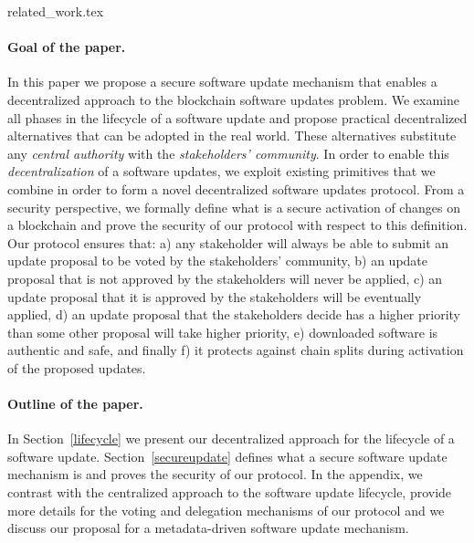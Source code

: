 {related_work.tex}
\paragraph{Goal of the paper.} In this paper we propose a secure software update mechanism that enables a decentralized approach to the blockchain software updates problem. We examine all phases in the lifecycle of a software update and propose practical decentralized alternatives that can be adopted in the real world. These alternatives substitute any \emph{central authority} with the \emph{stakeholders' community}. In order to enable this \emph{decentralization} of a software updates, we exploit existing primitives that we combine in order to form a novel decentralized software updates protocol. From a security perspective, we formally define what is a secure activation of changes on a blockchain and prove the security of our protocol with respect to this definition.  Our protocol ensures that:
a) any stakeholder will always be able to submit an update proposal to be voted by the stakeholders' community, b) an update proposal that is not approved by the stakeholders
 will never be applied, c) an update proposal that it is approved by the stakeholders will be eventually applied, d) an update proposal that the stakeholders decide has a higher priority than some other proposal will take higher priority, e) downloaded software is authentic and safe, and finally f) it protects against chain splits during activation of the proposed updates.

\paragraph{Outline of the paper.} In Section~\ref{lifecycle} we present our decentralized approach for the lifecycle of a software update. Section~\ref{secureupdate} defines what a secure software update mechanism is and proves the security of our protocol. In the appendix, we contrast with the centralized approach to the software update lifecycle, provide more details for the voting and delegation mechanisms of our protocol and we discuss our proposal for a metadata-driven software update mechanism.
